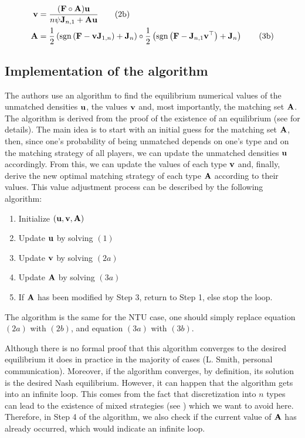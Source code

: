 \begin{align}[left=\empheqlbrace]
	\vect{v} &= \frac{(\vect{F} \circ \vect{A})\vect{u}}{n \psi \vect{J}_{n,1} + \vect{A} \vect{u}}
	\tag{2b}\\
	\vect{A} &= \frac{1}{2} \left(\sgn{\left( \vect{F} - \vect{v} \vect{J}_{1,n} \right)} + \vect{J}_n \right) \circ \frac{1}{2} \left(\sgn{\left( \vect{F} - \vect{J}_{n,1} \vect{v}^\top \right)} + \vect{J}_n \right)
	\tag{3b}
\end{align}





\subsection*{Implementation of the algorithm}

The authors use an algorithm to find the equilibrium numerical values of the unmatched densities $\boldsymbol{\mathbf{u}}$, the values $\boldsymbol{\mathbf{v}}$ and, most importantly, the matching set $\boldsymbol{\mathbf{A}}$. The algorithm is derived from the proof of the existence of an equilibrium (see \citep{smith_frictional_2011} for details). The main idea is to start with an initial guess for the matching set $\boldsymbol{\mathbf{A}}$, then, since one's probability of being unmatched depends on one's type and on the matching strategy of all players, we can update the unmatched densities $\boldsymbol{\mathbf{u}}$ accordingly. From this, we can update the values of each type $\boldsymbol{\mathbf{v}}$ and, finally, derive the new optimal matching strategy of each type $\boldsymbol{\mathbf{A}}$ according to their values. This value adjustment process can be described by the following algorithm:

\begin{enumerate}[start=0]
	\item Initialize $(\boldsymbol{\mathbf{u}},\boldsymbol{\mathbf{v}},\boldsymbol{\mathbf{A}})$
	\item Update $\boldsymbol{\mathbf{u}}$ by solving $(1)$
	\item Update $\boldsymbol{\mathbf{v}}$ by solving $(2a)$
	\item Update $\boldsymbol{\mathbf{A}}$ by solving $(3a)$
	\item If $\boldsymbol{\mathbf{A}}$ has been modified by Step 3, return to Step 1, else stop the loop.
\end{enumerate}

The algorithm is the same for the NTU case, one should simply replace equation $(2a)$ with $(2b)$, and equation $(3a)$ with $(3b)$.

Although there is no formal proof that this algorithm converges to the desired equilibrium it does in practice in the majority of cases (L. Smith, personal communication). Moreover, if the algorithm converges, by definition, its solution is the desired Nash equilibrium. However, it can happen that the algorithm gets into an infinite loop. This comes from the fact that discretization into $n$ types can lead to the existence of mixed strategies (see \citep{hagedorn_identifying_2017}) which we want to avoid here. Therefore, in Step 4 of the algorithm, we also check if the current value of $\boldsymbol{\mathbf{A}}$ has already occurred, which would indicate an infinite loop. 


